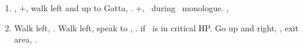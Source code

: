 \begin{enumerate}[resume]
  \item \sd, \cs+\skippablefmv[2:00], walk left and up to Gatta, \sd. \fmv+\cs[1:30], \sd\ during \tidus\ monologue. \cs[1:00], \sd
  \item Walk left, \sd. Walk left, speak to \auron, \sd. \save if \auron\ is in critical HP. Go up and right, \sd, exit area, \sd.
\end{enumerate}

